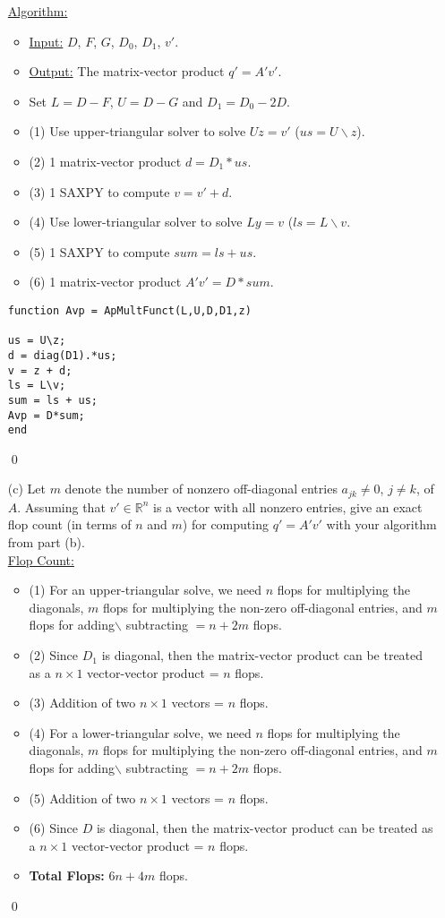 \documentclass[12pt]{article}
\def\R{\mathbb{R}}
\begin{document}
\begin{itemize}
\underline{Algorithm:}
\begin{itemize}
\item \underline{Input:} $D$, $F$, $G$, $D_0$, $D_1$, $v'$.
\item \underline{Output:} The matrix-vector product $q'=A'v'$.
\item Set $L=D-F$, $U=D-G$ and $D_1 = D_0 - 2D$.
\item (1) Use upper-triangular solver to solve $Uz=v'$ ($us = U\backslash z$).
\item (2) 1 matrix-vector product $d = D_1*us$.
\item (3) 1 SAXPY to compute $v = v' + d$.
\item (4) Use lower-triangular solver to solve $Ly=v$ ($ls=L\backslash v$.
\item (5) 1 SAXPY to compute $sum = ls + us$.
\item (6) 1 matrix-vector product $A'v' = D*sum$.
\end{itemize}

\lstset{language=matlab,frame=single}
\begin{lstlisting}[caption=Matlab Implementation of the Above Algorithm]
function Avp = ApMultFunct(L,U,D,D1,z)

us = U\z;
d = diag(D1).*us;
v = z + d;
ls = L\v;
sum = ls + us;
Avp = D*sum;
end
\end{lstlisting}\qed\\


\item[(c)] Let $m$ denote the number of nonzero off-diagonal entries $a_{jk}\neq 0$, $j\neq k$, of $A$.  Assuming that $v' \in\R^n$ is a vector with all nonzero entries, give an exact flop count (in terms of $n$ and $m$) for computing $q'=A'v'$ with your algorithm from part (b).\\

\newpage
\underline{Flop Count:}
\begin{itemize}
\item (1) For an upper-triangular solve, we need $n$ flops for multiplying the diagonals, $m$ flops for multiplying the non-zero off-diagonal entries, and $m$ flops for adding$\backslash$ subtracting $=n + 2m$ flops.
\item (2) Since $D_1$ is diagonal, then the matrix-vector product can be treated as a $n\times 1$ vector-vector product = $n$ flops.
\item (3) Addition of two $n\times 1$ vectors = $n$ flops.
\item (4) For a lower-triangular solve, we need $n$ flops for multiplying the diagonals, $m$ flops for multiplying the non-zero off-diagonal entries, and $m$ flops for adding$\backslash$ subtracting $=n + 2m$ flops.
\item (5) Addition of two $n\times 1$ vectors = $n$ flops.
\item (6) Since $D$ is diagonal, then the matrix-vector product can be treated as a $n\times 1$ vector-vector product = $n$ flops.
\item \textbf{Total Flops:} $6n + 4m$ flops.
\end{itemize}\qed
\end{itemize}
\end{document}
